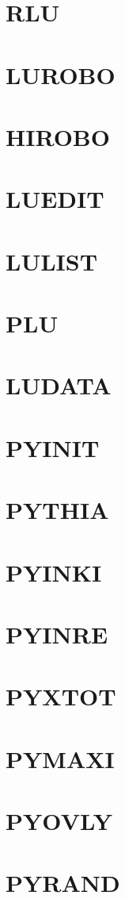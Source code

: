 \documentclass[14pt,UTF8]{ctexbook}
\begin{document}
\section{RLU}
\section{LUROBO}
\section{HIROBO}
\section{LUEDIT}
\section{LULIST}
\section{PLU}
\section{LUDATA}
\section{PYINIT}
\section{PYTHIA}
\section{PYINKI}
\section{PYINRE}
\section{PYXTOT}
\section{PYMAXI}
\section{PYOVLY}
\section{PYRAND}
\end{document}
